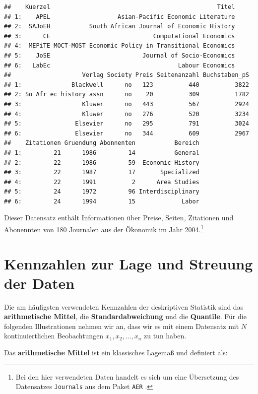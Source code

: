 \documentclass[]{book}
\let\rmarkdownfootnote\footnote%
\def\footnote{\protect\rmarkdownfootnote}
\begin{document}
\begin{verbatim}
##    Kuerzel                                               Titel
## 1:    APEL                   Asian-Pacific Economic Literature
## 2:  SAJoEH           South African Journal of Economic History
## 3:      CE                             Computational Economics
## 4:  MEPiTE MOCT-MOST Economic Policy in Transitional Economics
## 5:    JoSE                          Journal of Socio-Economics
## 6:   LabEc                                    Labour Economics
##                    Verlag Society Preis Seitenanzahl Buchstaben_pS
## 1:              Blackwell      no   123          440          3822
## 2: So Afr ec history assn      no    20          309          1782
## 3:                 Kluwer      no   443          567          2924
## 4:                 Kluwer      no   276          520          3234
## 5:               Elsevier      no   295          791          3024
## 6:               Elsevier      no   344          609          2967
##    Zitationen Gruendung Abonnenten           Bereich
## 1:         21      1986         14           General
## 2:         22      1986         59  Economic History
## 3:         22      1987         17       Specialized
## 4:         22      1991          2      Area Studies
## 5:         24      1972         96 Interdisciplinary
## 6:         24      1994         15             Labor
\end{verbatim}

Dieser Datensatz enthält Informationen über Preise, Seiten, Zitationen
und Abonennten von 180 Journalen aus der Ökonomik im Jahr
2004.\footnote{Bei den hier verwendeten Daten handelt es sich um eine
  Übersetzung des Datensatzes \texttt{Journals} aus dem Paket
  \texttt{AER} \citep{AER}.}

\section{Kennzahlen zur Lage und Streuung der
Daten}\label{kennzahlen-zur-lage-und-streuung-der-daten}

Die am häufigsten verwendeten Kennzahlen der deskriptiven Statistik sind
das \textbf{arithmetische Mittel}, die \textbf{Standardabweichung} und
die \textbf{Quantile}. Für die folgenden Illustrationen nehmen wir an,
dass wir es mit einem Datensatz mit \(N\) kontinuiertlichen
Beobachtungen \(x_1, x_2, ..., x_n\) zu tun haben.

Das \textbf{arithmetische Mittel} ist ein klassisches Lagemaß und
definiert als:
\end{document}
